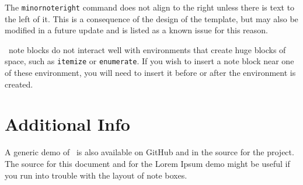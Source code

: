 \documentclass{ClassTeX}
\begin{document}
	The \texttt{minornoteright} command does not align to the right unless there is text to the left of it.  This is a consequence of the design of the template, but may also be modified in a future update and is listed as a known issue for this reason.
	
	\ClassTeX\ note blocks do not interact well with environments that create huge blocks of space, such as \texttt{itemize} or \texttt{enumerate}.  If you wish to insert a note block near one of these environment, you will need to insert it before or after the environment is created.
	\section{Additional Info}
	A generic demo of \ClassTeX\ is also available on GitHub and in the source for the project. The source for this document and for the Lorem Ipsum demo might be useful if you run into trouble with the layout of note boxes.
	
\end{document}
